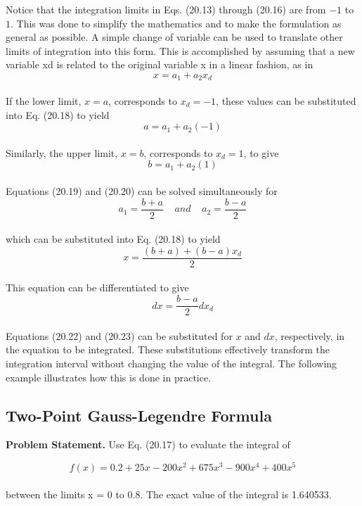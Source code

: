 Notice that the integration limits in Eqs. (20.13) through (20.16) are from $-1$ to $1$. This
was done to simplify the mathematics and to make the formulation as general as possible.
A simple change of variable can be used to translate other limits of integration into this
form. This is accomplished by assuming that a new variable xd is related to the original
variable x in a linear fashion, as in
\begin{equation}
	\tag{20.18}
	x = a_1 + a_2x_d
\end{equation}\\
If the lower limit, $x = a$, corresponds to $x_d = −1$, these values can be substituted into
Eq. (20.18) to yield
\begin{equation}
	\tag{20.19}
	a=a_1 + a_2(-1)
\end{equation}\\
Similarly, the upper limit, $x = b$, corresponds to $x_d = 1$, to give
\begin{equation}
	\tag{20.20}
	b=a_1 + a_2(1)
\end{equation}\\
Equations (20.19) and (20.20) can be solved simultaneously for
\begin{equation}
	\tag{20.21}
	a_1=\dfrac{b+a}{2}\; \; \; \; and \; \; \; \;
	a_2=\dfrac{b-a}{2}
\end{equation}\\
which can be substituted into Eq. (20.18) to yield
\begin{equation}
	\tag{20.22}
	x = \dfrac{(b+a)+(b-a)x_d}{2}
\end{equation}\\
This equation can be differentiated to give
\begin{equation}
	\tag{20.23}
	dx = \dfrac{b-a}{2} dx_d
\end{equation}\\
Equations (20.22) and (20.23) can be substituted for $x$ and $dx$, respectively, in the equation
to be integrated. These substitutions effectively transform the integration interval without
changing the value of the integral. The following example illustrates how this is done in
practice.


\subsection{Two-Point Gauss-Legendre Formula}
\textbf{Problem Statement.} Use Eq. (20.17) to evaluate the integral of

	$$f(x)=0.2+25x-200x^2 + 675x^3 - 900x^4 +400x^5$$\\
between the limits x = 0 to 0.8. The exact value of the integral is 1.640533.

